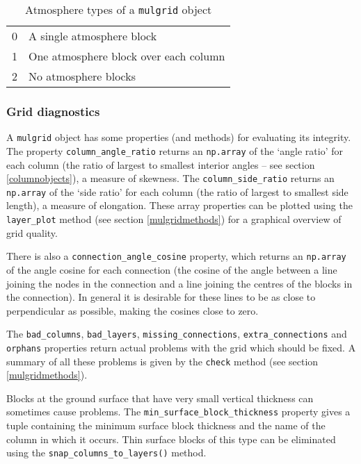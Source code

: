 \begin{table}
  \begin{center}
    \begin{tabular}{|l|l|}
      \hline
      0 & A single atmosphere block \\
      1 & One atmosphere block over each column \\
      2 & No atmosphere blocks \\
      \hline
    \end{tabular}
    \caption{Atmosphere types of a \texttt{mulgrid} object}
    \label{tb:mulgrid_atmosphere_types}
  \end{center}
\end{table}

\subsubsection{Grid diagnostics}

A \texttt{mulgrid} object has some properties (and methods) for evaluating its integrity.  The property \texttt{column\_angle\_ratio} returns an \texttt{np.array} of the `angle ratio' for each column (the ratio of largest to smallest interior angles -- see section \ref{columnobjects}), a measure of skewness.  The \texttt{column\_side\_ratio} returns an \texttt{np.array} of the `side ratio' for each column (the ratio of largest to smallest side length), a measure of elongation.  These array properties can be plotted using the \texttt{layer\_plot} method (see section \ref{mulgridmethods}) for a graphical overview of grid quality.

There is also a \texttt{connection\_angle\_cosine} property, which returns an \texttt{np.array} of the angle cosine for each connection (the cosine of the angle between a line joining the nodes in the connection and a line joining the centres of the blocks in the connection).  In general it is desirable for these lines to be as close to perpendicular as possible, making the cosines close to zero.

The \texttt{bad\_columns}, \texttt{bad\_layers}, \texttt{missing\_connections}, \texttt{extra\_connections} and \texttt{orphans} properties return actual problems with the grid which should be fixed.  A summary of all these problems is given by the \texttt{check} method (see section \ref{mulgridmethods}).

Blocks at the ground surface that have very small vertical thickness can sometimes cause problems.  The \texttt{min\_surface\_block\_thickness} property gives a tuple containing the minimum surface block thickness and the name of the column in which it occurs.  Thin surface blocks of this type can be eliminated using the \texttt{snap\_columns\_to\_layers()} method.

